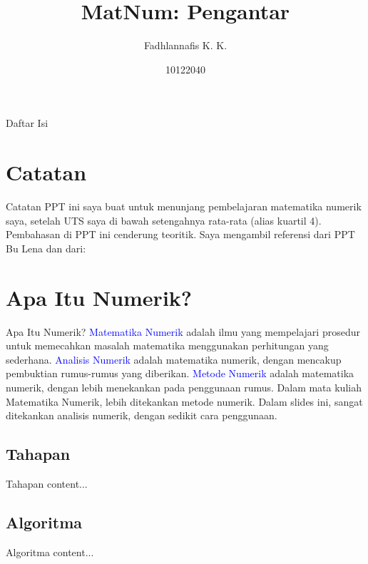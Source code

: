 \documentclass[xcolor={dvipsnames}, 9pt]{beamer}
\title{MatNum: Pengantar}
\author{Fadhlannafis K. K.}
\date{10122040}
\renewcommand{\emph}[1]{\textcolor{Blue}{#1}}
\begin{document}
	\begin{frame}[plain]
		\maketitle
	\end{frame}
	\begin{frame}{Daftar Isi}
		\tableofcontents
	\end{frame}
	\section*{Catatan}
	\begin{frame}{Catatan}
		PPT ini saya buat untuk menunjang pembelajaran matematika numerik saya, setelah UTS saya di bawah setengahnya rata-rata (alias kuartil 4). \newline
		Pembahasan di PPT ini cenderung teoritik. Saya mengambil referensi dari PPT Bu Lena dan dari:
		\nocite{*}
		\printbibliography
	\end{frame}
	\section{Apa Itu Numerik?}
	\begin{frame}{Apa Itu Numerik?}
		\emph{Matematika Numerik} adalah ilmu yang mempelajari prosedur untuk memecahkan masalah matematika menggunakan perhitungan yang sederhana. \newline
		\emph{Analisis Numerik} adalah matematika numerik, dengan mencakup pembuktian rumus-rumus yang diberikan. \newline
		\emph{Metode Numerik} adalah matematika numerik, dengan lebih menekankan pada penggunaan rumus. \newline
        Dalam mata kuliah Matematika Numerik, lebih ditekankan metode numerik. \newline
        Dalam slides ini, sangat ditekankan analisis numerik, dengan sedikit cara penggunaan.
	\end{frame}
	\subsection{Tahapan}
	\begin{frame}{Tahapan}
		content...
	\end{frame}
	\subsection{Algoritma}
	\begin{frame}{Algoritma}
		content...
	\end{frame}
\end{document}
